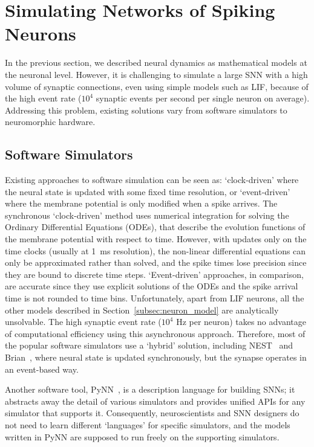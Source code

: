 
\section{Simulating Networks of Spiking Neurons}
\label{sec:snn_sim}
In the previous section, we described neural dynamics as mathematical models at the neuronal level.
However, it is challenging to simulate a large SNN with a high volume of synaptic connections, even using simple models such as LIF, because of the high event rate ($10^4$ synaptic events per second per single neuron on average).
Addressing this problem, existing solutions vary from software simulators to neuromorphic hardware.

\subsection{Software Simulators}
Existing approaches to software simulation can be seen as: `clock-driven' where the neural state is updated with some fixed time resolution, or `event-driven' where the membrane potential is only modified when a spike arrives.
The synchronous `clock-driven' method uses numerical integration for solving the Ordinary Differential Equations (ODEs), that describe the evolution functions of the membrane potential with respect to time.
However, with updates only on the time clocks (usually at 1~ms resolution), the non-linear differential equations can only be approximated rather than solved, and the spike times lose precision since they are bound to discrete time steps.
`Event-driven' approaches, in comparison, are accurate since they use explicit solutions of the ODEs and the spike arrival time is not rounded to time bins.
Unfortunately, apart from LIF neurons, all the other models described in Section~\ref{subsec:neuron_model} are analytically unsolvable.
The high synaptic event rate ($10^4$ Hz per neuron) takes no advantage of computational efficiency using this asynchronous approach.
Therefore, most of the popular software simulators use a `hybrid' solution, including NEST~\citep{gewaltig2007nest} and Brian~\citep{goodman2008brian}, where 
neural state is updated synchronously, but the synapse operates in an event-based way.

Another software tool, PyNN~\citep{davison2008pynn}, is a description language for building SNNs;
it abstracts away the detail of various simulators and provides unified APIs for any simulator that supports it.
Consequently, neuroscientists and SNN designers do not need to learn different `languages' for specific simulators, and the models written in PyNN are supposed to run freely on the supporting simulators.

